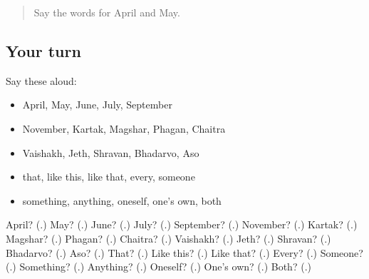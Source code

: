 \begin{quote}
Say the words for April and May.
\end{quote}

\subsection*{Your turn}
Say these aloud:

\begin{itemize}
\raggedright
  \item April, May, June, July, September
  \item November, Kartak, Magshar, Phagan, Chaitra
  \item Vaishakh, Jeth, Shravan, Bhadarvo, Aso
  \item that, like this, like that, every, someone
  \item something, anything, oneself, one's own, both
\end{itemize}

\begin{tcolorbox}[breakable,colback=teal!4,colframe=teal!35!black,title={Before you move on}]
April? (\textbf{}.) May? (\textbf{}.) June? (\textbf{}.) July? (\textbf{}.) September? (\textbf{}.) November? (\textbf{}.) Kartak? (\textbf{}.) Magshar? (\textbf{}.) Phagan? (\textbf{}.) Chaitra? (\textbf{}.) Vaishakh? (\textbf{}.) Jeth? (\textbf{}.) Shravan? (\textbf{}.) Bhadarvo? (\textbf{}.) Aso? (\textbf{}.) That? (\textbf{}.) Like this? (\textbf{}.) Like that? (\textbf{}.) Every? (\textbf{}.) Someone? (\textbf{}.) Something? (\textbf{}.) Anything? (\textbf{}.) Oneself? (\textbf{}.) One's own? (\textbf{}.) Both? (\textbf{}.)
\end{tcolorbox}
